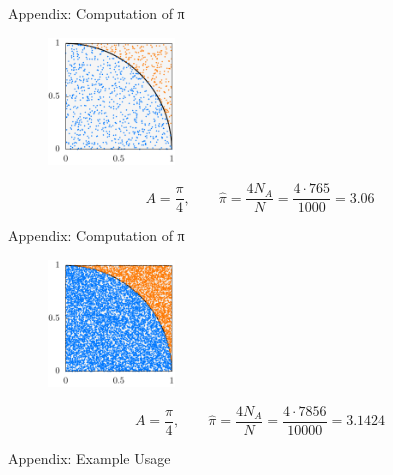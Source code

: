\documentclass[aspectratio=169]{beamer}
\newcommand{\inputCodeBlock}[1]{%
    \begin{center}
        
    \end{center}
}
\begin{document}
  \begin{frame}{Appendix: Computation of π}
    \begin{figure}
      \includegraphics[width=0.3\textwidth]{figures/monte_carlo_pi_1000_765.pdf}
    \end{figure}
    \begin{mybox}
      \[
        A = \frac{π}{4}, \qquad \hat{π} = \frac{4 N_A}{N} = \frac{4 \cdot 765}{1000} = 3.06
      \]
    \end{mybox}
  \end{frame}

  \begin{frame}{Appendix: Computation of π}
    \begin{figure}
      \includegraphics[width=0.3\textwidth]{figures/monte_carlo_pi_10000_7856.pdf}
    \end{figure}
    \begin{mybox}
      \[
        A = \frac{π}{4}, \qquad \hat{π} = \frac{4 N_A}{N} = \frac{4 \cdot 7856}{10000} = 3.1424
      \]
    \end{mybox}
  \end{frame}

  \begin{frame}{Appendix: Example Usage}
    \hspace{8em}
    \begin{minipage}[c]{0.7\textwidth}
      \inputCodeBlock{code/monte_carlo_pi.cpp}
    \end{minipage}
  \end{frame}
\end{document}
